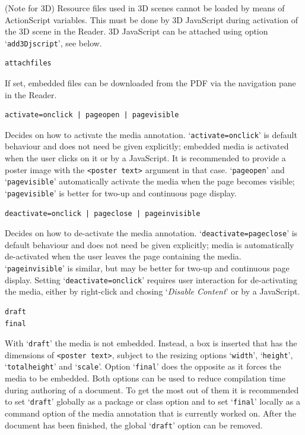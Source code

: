 \documentclass[a4paper]{article}
\begin{document}
(Note for 3D) Resource files used in 3D scenes cannot be loaded by means of ActionScript variables. This must be done by 3D JavaScript during activation of the 3D scene in the Reader. 3D JavaScript can be attached using option `\verb+add3Djscript+', see below.
\begin{verbatim}
attachfiles
\end{verbatim}
If set, embedded files can be downloaded from the PDF via the  navigation pane in the Reader.
\begin{verbatim}
activate=onclick | pageopen | pagevisible
\end{verbatim}
Decides on how to activate the media annotation. `\verb+activate=onclick+' is default behaviour and does not need be given explicitly; embedded media is activated when the user clicks on it or by a JavaScript. It is recommended to provide a poster image with the \verb+<poster text>+ argument in that case. `\verb+pageopen+' and `\verb+pagevisible+' automatically activate the media when the page becomes visible; `{\tt pagevisible}' is better for two-up and continuous page display.
\begin{verbatim}
deactivate=onclick | pageclose | pageinvisible
\end{verbatim}
Decides on how to de-activate the media annotation. `\verb+deactivate=pageclose+' is default behaviour and does not need be given explicitly; media is automatically de-activated when the user leaves the page containing the media. `\verb+pageinvisible+' is similar, but may be better for two-up and continuous page display. Setting `\verb+deactivate=onclick+' requires user interaction for de-activating the media, either by right-click and chosing `\emph{\sffamily Disable Content}' or by a JavaScript.
\hypertarget{draftfinal}{}%
\begin{verbatim}
draft
final
\end{verbatim}
With `\verb+draft+' the media is not embedded. Instead, a box is inserted that has the dimensions of \verb+<poster text>+, subject to the resizing options `\verb+width+', `\verb+height+', `\verb+totalheight+' and `\verb+scale+'. Option `\verb+final+' does the opposite as it forces the media to be embedded. Both options can be used to reduce compilation time during authoring of a document. To get the most out of them it is recommended to set `\verb+draft+' globally as a package or class option and to set `\verb+final+' locally as a command option of the media annotation that is currently worked on. After the document has been finished, the global `\verb+draft+' option can be removed.
\end{document}
